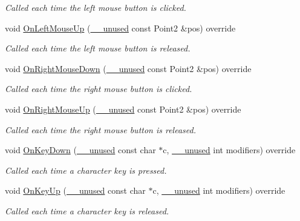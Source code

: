 \begin{DoxyCompactItemize}
\begin{DoxyCompactList}\small\item\em Called each time the left mouse button is clicked. \end{DoxyCompactList}\item 
void \hyperlink{classGraphicsArenaViewer_abe4f11ab9bfb6055280ddf2b671d7032}{On\+Left\+Mouse\+Up} (\hyperlink{common_8h_a2e3484535ee610c8e19e9859563abe48}{\+\_\+\+\_\+unused} const Point2 \&pos) override
\begin{DoxyCompactList}\small\item\em Called each time the left mouse button is released. \end{DoxyCompactList}\item 
void \hyperlink{classGraphicsArenaViewer_a178a9f09ff241d4dc032b6d0998cc9c6}{On\+Right\+Mouse\+Down} (\hyperlink{common_8h_a2e3484535ee610c8e19e9859563abe48}{\+\_\+\+\_\+unused} const Point2 \&pos) override
\begin{DoxyCompactList}\small\item\em Called each time the right mouse button is clicked. \end{DoxyCompactList}\item 
void \hyperlink{classGraphicsArenaViewer_a5dfa16dca83575e253b6d3ea344f8746}{On\+Right\+Mouse\+Up} (\hyperlink{common_8h_a2e3484535ee610c8e19e9859563abe48}{\+\_\+\+\_\+unused} const Point2 \&pos) override
\begin{DoxyCompactList}\small\item\em Called each time the right mouse button is released. \end{DoxyCompactList}\item 
void \hyperlink{classGraphicsArenaViewer_ab0001d4a3ebde2b1f5b4cb7770824726}{On\+Key\+Down} (\hyperlink{common_8h_a2e3484535ee610c8e19e9859563abe48}{\+\_\+\+\_\+unused} const char $\ast$c, \hyperlink{common_8h_a2e3484535ee610c8e19e9859563abe48}{\+\_\+\+\_\+unused} int modifiers) override
\begin{DoxyCompactList}\small\item\em Called each time a character key is pressed. \end{DoxyCompactList}\item 
void \hyperlink{classGraphicsArenaViewer_ac3e749f6a75bdd5b32d23c9c8913f9d8}{On\+Key\+Up} (\hyperlink{common_8h_a2e3484535ee610c8e19e9859563abe48}{\+\_\+\+\_\+unused} const char $\ast$c, \hyperlink{common_8h_a2e3484535ee610c8e19e9859563abe48}{\+\_\+\+\_\+unused} int modifiers) override
\begin{DoxyCompactList}\small\item\em Called each time a character key is released. \end{DoxyCompactList}\item 

\end{DoxyCompactItemize}

